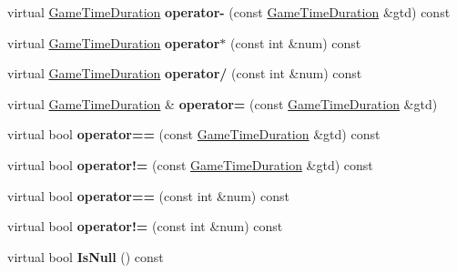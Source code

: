 \begin{DoxyCompactItemize}
\item 
virtual \hyperlink{class_game_time_duration}{Game\+Time\+Duration} {\bfseries operator-\/} (const \hyperlink{class_game_time_duration}{Game\+Time\+Duration} \&gtd) const \hypertarget{class_game_time_duration_a844edf7d91050f752e678e6df5e2db98}{}\label{class_game_time_duration_a844edf7d91050f752e678e6df5e2db98}

\item 
virtual \hyperlink{class_game_time_duration}{Game\+Time\+Duration} {\bfseries operator$\ast$} (const int \&num) const \hypertarget{class_game_time_duration_aecb72c27fa752f4b3a4efd4b5ab5d468}{}\label{class_game_time_duration_aecb72c27fa752f4b3a4efd4b5ab5d468}

\item 
virtual \hyperlink{class_game_time_duration}{Game\+Time\+Duration} {\bfseries operator/} (const int \&num) const \hypertarget{class_game_time_duration_ac788e8ad8bf82f3be1916761d2c4ba2b}{}\label{class_game_time_duration_ac788e8ad8bf82f3be1916761d2c4ba2b}

\item 
virtual \hyperlink{class_game_time_duration}{Game\+Time\+Duration} \& {\bfseries operator=} (const \hyperlink{class_game_time_duration}{Game\+Time\+Duration} \&gtd)\hypertarget{class_game_time_duration_a1fd0e2309088c783e990b72983c380ee}{}\label{class_game_time_duration_a1fd0e2309088c783e990b72983c380ee}

\item 
virtual bool {\bfseries operator==} (const \hyperlink{class_game_time_duration}{Game\+Time\+Duration} \&gtd) const \hypertarget{class_game_time_duration_a75c5a15a30224e49928240e20f985a38}{}\label{class_game_time_duration_a75c5a15a30224e49928240e20f985a38}

\item 
virtual bool {\bfseries operator!=} (const \hyperlink{class_game_time_duration}{Game\+Time\+Duration} \&gtd) const \hypertarget{class_game_time_duration_a311992af9580f4e5b2ad300cd854cece}{}\label{class_game_time_duration_a311992af9580f4e5b2ad300cd854cece}

\item 
virtual bool {\bfseries operator==} (const int \&num) const \hypertarget{class_game_time_duration_aa2fa4d6db22489b5c0863e2502d50469}{}\label{class_game_time_duration_aa2fa4d6db22489b5c0863e2502d50469}

\item 
virtual bool {\bfseries operator!=} (const int \&num) const \hypertarget{class_game_time_duration_ad0c56354b73e35d87f55a8a480478e10}{}\label{class_game_time_duration_ad0c56354b73e35d87f55a8a480478e10}

\item 
virtual bool {\bfseries Is\+Null} () const \hypertarget{class_game_time_duration_a30e03c0514575d279b30545e18c18dd4}{}\label{class_game_time_duration_a30e03c0514575d279b30545e18c18dd4}

\end{DoxyCompactItemize}
